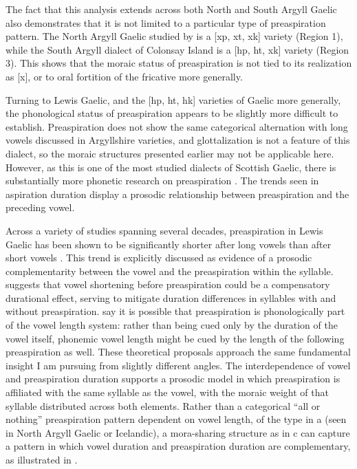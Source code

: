 \documentclass[output=paper,colorlinks,citecolor=brown]{langscibook}
\begin{document}
The fact that this analysis extends across both North and South Argyll Gaelic also demonstrates that it is not limited to a particular type of preaspiration pattern. The North Argyll Gaelic studied by \citet{iosadetal2015} is a [xp, xt, xk] variety (Region 1), while the South Argyll dialect of Colonsay Island is a [hp, ht, xk] variety (Region 3). This shows that the moraic status of preaspiration is not tied to its realization as [x], or to oral fortition of the fricative more generally.%

Turning to Lewis Gaelic, and the [hp, ht, hk] varieties of Gaelic more generally, the phonological status of preaspiration appears to be slightly more difficult to establish. Preaspiration does not show the same categorical alternation with long vowels discussed in Argyllshire varieties, and glottalization is not a feature of this dialect, so the moraic structures presented earlier may not be applicable here. However, as this is one of the most studied dialects of Scottish Gaelic, there is substantially more phonetic research on preaspiration \citep{nichasaideodochartaigh1984,nichasaide1985,ladefogedetal1998,Clayton:2010,nancestuartsmith2013,nanceomaolalaigh2021}. The trends seen in aspiration duration display a prosodic relationship between preaspiration and the preceding vowel.

Across a variety of studies spanning several decades, preaspiration in Lewis Gaelic has been shown to be significantly shorter after long vowels than after short vowels \citep{nichasaide1985,Clayton:2010,nancestuartsmith2013}. This trend is explicitly discussed as evidence of a prosodic complementarity between the vowel and the preaspiration within the syllable. \citet{nichasaide1985} suggests that vowel shortening before preaspiration could be a compensatory durational effect, serving to mitigate duration differences in syllables with and without preaspiration. \citet{nancestuartsmith2013} say it is possible that preaspiration is phonologically part of the vowel length system: rather than being cued only by the duration of the vowel itself, phonemic vowel length might be cued by the length of the following preaspiration as well. These theoretical proposals approach the same fundamental insight I am pursuing from slightly different angles. The interdependence of vowel and preaspiration duration supports a prosodic model in which preaspiration is affiliated with the same syllable as the vowel, with the moraic weight of that syllable distributed across both elements. Rather than a categorical ``all or nothing'' preaspiration pattern dependent on vowel length, of the type in a (seen in North Argyll Gaelic or Icelandic), a mora-sharing structure as in c can capture a pattern in which vowel duration and preaspiration duration are complementary, as illustrated in .
\end{document}
